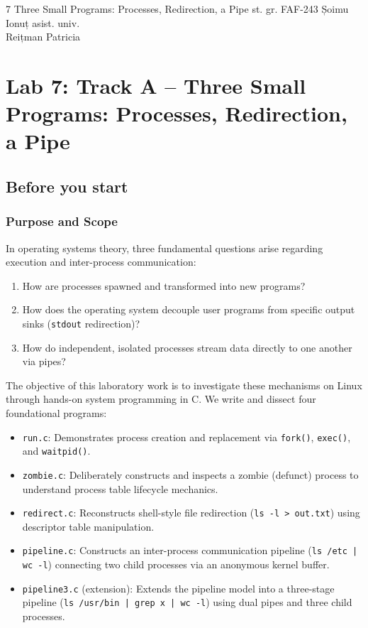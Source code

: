 \documentclass{labreport}
\begin{document}
\labtitle
    {7}
    {Three Small Programs: Processes, Redirection, a Pipe}
    {st. gr. FAF-243}
    {Șoimu Ionuț}
    {asist. univ.\\[0.15cm] Reițman Patricia}

\tableofcontents
\newpage

\section{Lab 7: Track A -- Three Small Programs: Processes, Redirection, a Pipe}

\subsection{Before you start}

\subsubsection*{Purpose and Scope}
In operating systems theory, three fundamental questions arise regarding execution and inter-process communication:
\begin{enumerate}[label=(\alph*), noitemsep]
    \item How are processes spawned and transformed into new programs?
    \item How does the operating system decouple user programs from specific output sinks (\texttt{stdout} redirection)?
    \item How do independent, isolated processes stream data directly to one another via pipes?
\end{enumerate}
The objective of this laboratory work is to investigate these mechanisms on Linux through hands-on system programming in C. We write and dissect four foundational programs:
\begin{itemize}[noitemsep]
    \item \texttt{run.c}: Demonstrates process creation and replacement via \texttt{fork()}, \texttt{exec()}, and \texttt{waitpid()}.
    \item \texttt{zombie.c}: Deliberately constructs and inspects a zombie (defunct) process to understand process table lifecycle mechanics.
    \item \texttt{redirect.c}: Reconstructs shell-style file redirection (\texttt{ls -l > out.txt}) using descriptor table manipulation.
    \item \texttt{pipeline.c}: Constructs an inter-process communication pipeline (\texttt{ls /etc | wc -l}) connecting two child processes via an anonymous kernel buffer.
    \item \texttt{pipeline3.c} (extension): Extends the pipeline model into a three-stage pipeline (\texttt{ls /usr/bin | grep x | wc -l}) using dual pipes and three child processes.
\end{itemize}
\end{document}
